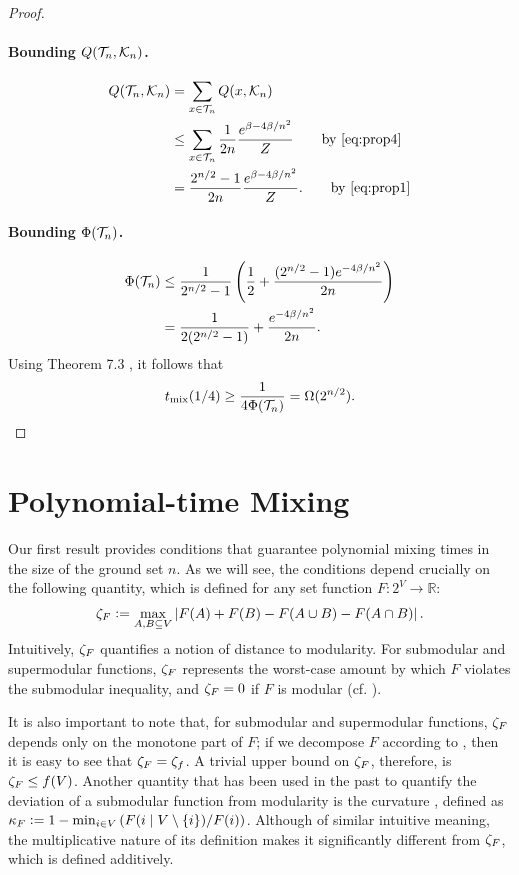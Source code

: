 \begin{proof}
\paragraph{Bounding $Q(\mathcal{T}_n, \mathcal{K}_n)$.}
\begin{align*}
  Q(\htn, \hkn) &= \sum_{x \in \htn} Q(x, \hkn) \\
                &\leq \sum_{x \in \htn} \frac{1}{2n} \frac{e^{\beta - 4\beta/n^2}}{Z} \tag*{by \eqref{eq:prop4}} \\
                &= \frac{2^{n/2} - 1}{2n} \frac{e^{\beta - 4\beta/n^2}}{Z}. \tag*{by \eqref{eq:prop1}}
\end{align*}

\paragraph{Bounding $\Phi(\mathcal{T}_n)$.}
\begin{align*}
  \Phi(\mathcal{T}_n) &\leq \frac{1}{2^{n/2} - 1}\left(\frac{1}{2} + \frac{(2^{n/2} - 1) e^{-4\beta/n^2}}{2n}\right)\\
          &= \frac{1}{2(2^{n/2} - 1)} + \frac{e^{-4\beta/n^2}}{2n}.
\end{align*}
Using Theorem 7.3 \citep{levin08book}, it follows that
\begin{align*}
  t_{\mathrm{mix}}(1/4) \geq \frac{1}{4\Phi(\mathcal{T}_n)} = \Omega(2^{n/2}).
\end{align*}

\end{proof}

\section{Polynomial-time Mixing} \label{sect:poly}
Our first result provides conditions that guarantee polynomial mixing times in the size of the ground set $n$.
As we will see, the conditions depend crucially on the following quantity, which is defined for any set function $F : 2^V \to \mathbb{R}$:
\begin{align*}
  \zeta_F \vcentcolon= \max_{A, B \subseteq V} \left|F(A) + F(B) - F(A \cup B) - F(A \cap B) \right|.
\end{align*}
Intuitively, $\zeta_F$ quantifies a notion of distance to modularity.
For submodular and supermodular functions, $\zeta_F$ represents the worst-case amount by which $F$ violates the submodular inequality, and $\zeta_F = 0$ if $F$ is modular (cf. ).

It is also important to note that, for submodular and supermodular functions, $\zeta_F$ depends only on the monotone part of $F$; if we decompose $F$ according to , then it is easy to see that $\zeta_F = \zeta_f$.
A trivial upper bound on $\zeta_F$, therefore, is $\zeta_F \leq f(V)$.
Another quantity that has been used in the past to quantify the deviation of a submodular function from modularity is the curvature \citep{conforti84}, defined as $\kappa_F \vcentcolon= 1 - \min_{i \in V} \left(F(i\mid V\setminus\{i\}) / F(i)\right)$.
Although of similar intuitive meaning, the multiplicative nature of its definition makes it significantly different from $\zeta_F$, which is defined additively.

